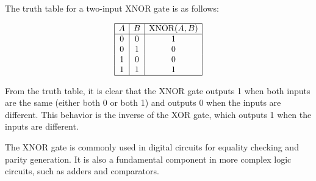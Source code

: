 The truth table for a two-input XNOR gate is as follows:

\[
\begin{array}{|c|c|c|}
\hline
A & B & \text{XNOR}(A, B) \\
\hline
0 & 0 & 1 \\
0 & 1 & 0 \\
1 & 0 & 0 \\
1 & 1 & 1 \\
\hline
\end{array}
\]

From the truth table, it is clear that the XNOR gate outputs 1 when both inputs are the same (either both 0 or both 1) and outputs 0 when the inputs are different. This behavior is the inverse of the XOR gate, which outputs 1 when the inputs are different.

The XNOR gate is commonly used in digital circuits for equality checking and parity generation. It is also a fundamental component in more complex logic circuits, such as adders and comparators.

